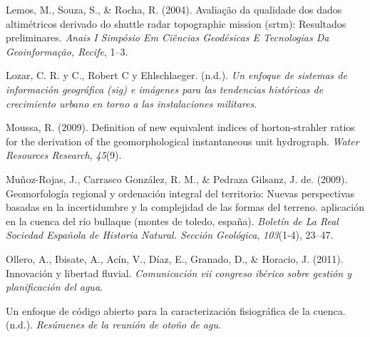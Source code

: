 \documentclass[11pt,]{article}
\begin{document}
\hypertarget{ref-lemos2004avaliaccao}{}
Lemos, M., Souza, S., \& Rocha, R. (2004). Avaliação da qualidade dos
dados altimétricos derivado do shuttle radar topographic mission (srtm):
Resultados preliminares. \emph{Anais I Simpósio Em Ciências Geodésicas E
Tecnologias Da Geoinformação, Recife}, 1--3.

\hypertarget{ref-lozar2003geographic}{}
Lozar, C. R. y C., Robert C y Ehlschlaeger. (n.d.). \emph{Un enfoque de
sistemas de información geográfica (sig) e imágenes para las tendencias
históricas de crecimiento urbano en torno a las instalaciones
militares}.

\hypertarget{ref-moussa2009definition}{}
Moussa, R. (2009). Definition of new equivalent indices of
horton-strahler ratios for the derivation of the geomorphological
instantaneous unit hydrograph. \emph{Water Resources Research},
\emph{45}(9).

\hypertarget{ref-munoz2009geomorfologia}{}
Muñoz-Rojas, J., Carrasco González, R. M., \& Pedraza Gilsanz, J. de.
(2009). Geomorfología regional y ordenación integral del territorio:
Nuevas perspectivas basadas en la incertidumbre y la complejidad de las
formas del terreno. aplicación en la cuenca del río bullaque (montes de
toledo, españa). \emph{Boletín de La Real Sociedad Española de Historia
Natural. Sección Geológica}, \emph{103}(1-4), 23--47.

\hypertarget{ref-ollero2011innovacion}{}
Ollero, A., Ibisate, A., Acín, V., Díaz, E., Granado, D., \& Horacio, J.
(2011). Innovación y libertad fluvial. \emph{Comunicación vii congreso
ibérico sobre gestión y planificación del agua}.

\hypertarget{ref-di2013open}{}
Un enfoque de código abierto para la caracterización fisiográfica de la
cuenca. (n.d.). \emph{Resúmenes de la reunión de otoño de agu}.




\newpage
\singlespacing 
\end{document}
